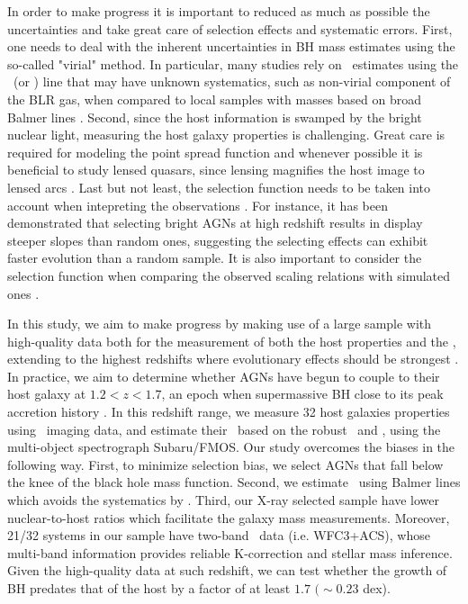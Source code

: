 \documentclass[apj]{emulateapj}
\begin{document}
In order to make progress it is important to reduced as much as possible the uncertainties and take great care of selection effects and systematic errors. First, one needs to deal with the inherent uncertainties in BH mass estimates using the so-called "virial" method. In particular, many studies rely on \mbh\ estimates using the \Civ\ (or \Mgii) line that may have unknown systematics, such as non-virial component of the BLR gas, when compared to local samples with masses based on broad Balmer lines \citep[i.e. \halpha\ and \hbeta,][]{Schulze2018, Baskin2005, Trakhtenbrot2012}. Second, since the host information is swamped by the bright nuclear light, measuring the host galaxy properties is challenging. Great care is required for modeling the point spread function and whenever possible it is beneficial to study lensed quasars, since lensing magnifies the host image to lensed arcs \citep{Pen++06qsob, Ding2017a, Ding2017b}. Last but not least, the selection function needs to be taken into account when intepreting the observations \citep{Treu2007,Lauer2007}. For instance, it has been demonstrated \citep{Schulze2011, Schulze2014} that selecting bright AGNs at high redshift results in display steeper slopes than random ones, suggesting the selecting effects can exhibit faster evolution than a random sample. It is also important to consider the selection function when comparing the observed scaling relations with simulated ones \citep{DeG++15}.

In this study, we aim to make progress by making use of a large sample with high-quality data both for the measurement of both the host properties and the \mbh, extending to the highest redshifts where evolutionary effects should be strongest \citep{DeG++15}. In practice, we aim to determine whether AGNs have begun to couple to their host galaxy at $1.2<z<1.7$, an epoch when supermassive BH close to its peak accretion history \citep{Aird2015}.  In this redshift range, we measure 32 host galaxies properties using \hst\ imaging data, and estimate their \mbh\ based on the robust \halpha\ and \hbeta, using the multi-object spectrograph Subaru/FMOS. Our study overcomes the biases in the following way. First, to minimize selection bias, we select AGNs that fall below the knee of the black hole mass function. Second, we estimate \mbh\ using Balmer lines which avoids the systematics by \Mgii. Third, our X-ray selected sample have lower nuclear-to-host ratios which facilitate the galaxy mass measurements. Moreover, 21/32 systems in our sample have two-band \hst\ data (i.e. WFC3+ACS), whose multi-band information provides reliable K-correction and stellar mass inference. Given the high-quality data at such redshift, we can test whether the growth of BH predates that of the host by a factor of at least $1.7$ $(\sim0.23$ dex). 
\end{document}
